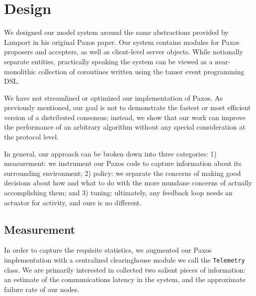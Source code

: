 
\newcommand{\Tbf}{T_{\mathit{bf}}}
\newcommand{\Thb}{T_{\mathit{hb}}}
\newcommand{\Tto}{T_{\mathit{to}}}
\newcommand{\Tl}{T_{\mathit{l}}}
\newcommand{\Cr}{C_{\mathit{r}}}
\newcommand{\Chb}{C_{\mathit{hb}}}
\newcommand{\Pff}{P_{\mathit{ff}}}
\newcommand{\Ptf}{P_{\mathit{tf}}}

\section{Design}
We designed our model system around the same abstractions provided by Lamport in his original Paxos paper.
Our system contains modules for Paxos proposers and accepters, as well as client-level server objects.
While notionally separate entities, practically speaking the system can be viewed as a near-monolithic collection of coroutines written using the tamer \cite{tamer} event programming DSL.

We have not streamlined or optimized our implementation of Paxos.
As previously mentioned, our goal is not to demonstrate the fastest or most efficient version of a distributed consensus;
instead, we show that our work can improve the performance of an arbitrary algorithm without any special consideration at the protocol level.

In general, our approach can be broken down into three categories:
1) measurement: we instrument our Paxos code to capture information about its surrounding environment;
2) policy: we separate the concerns of making good decisions about how and what to do with the more mundane concerns of actually accomplishing them;
and 3) tuning: ultimately, any feedback loop needs an actuator for activity, and ours is no different.

\subsection{Measurement}
In order to capture the requisite statistics, we augmented our Paxos implementation with a centralized clearinghouse module we call the \texttt{Telemetry} class.
We are primarily interested in collected two salient pieces of information:
an estimate of the communications latency in the system, and the approximate failure rate of our nodes.

